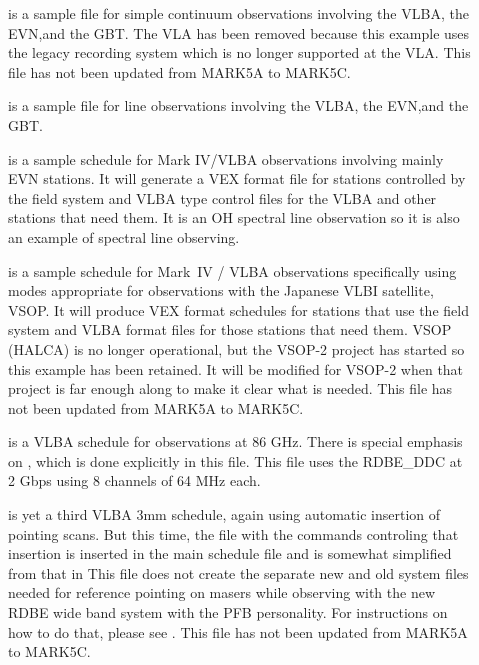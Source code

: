 \documentclass{report}
\begin{document}
\begin{description}
\item[]
is a sample file for simple continuum observations involving the VLBA,
the EVN,and the GBT.  The VLA has been removed because this example
uses the legacy recording system which is no longer supported at the
VLA. This file has not been updated from MARK5A to MARK5C.

\item[]
is a sample file for line observations involving the VLBA,
the EVN,and the GBT.

\item[] is a
sample schedule for Mark IV/VLBA observations involving mainly EVN
stations.  It will generate a VEX format file for stations controlled
by the field system and VLBA type control files for the VLBA and other
stations that need them.  It is an OH spectral line observation so it
is also an example of spectral line observing.

\item[] is a
sample schedule for Mark~IV / VLBA observations specifically using
modes appropriate for observations with the Japanese VLBI satellite,
VSOP.  It will produce VEX format schedules for stations that use the
field system and VLBA format files for those stations that need them.
VSOP (HALCA) is no longer operational, but the VSOP-2 project has started
so this example has been retained.  It will be modified for VSOP-2
when that project is far enough along to make it clear what is needed.
This file has not been updated from MARK5A to MARK5C.

\item[] is a
VLBA schedule for observations at 86 GHz.  There is special emphasis
on , which is done
explicitly in this file.   This file uses the RDBE\_DDC at 2 Gbps
using 8 channels of 64 MHz each.

\item[] is
yet a third VLBA 3mm schedule, again using automatic insertion of
pointing scans.  But this time, the file with the commands controling
that insertion is inserted in the main schedule file and is somewhat
simplified from that in 
This file does not create the separate new and old system files needed
for reference pointing on masers while observing with the new RDBE wide
band system with the PFB personality.  For instructions on how to do 
that, please see 
.
This file has not been updated from MARK5A to MARK5C.


\end{description}
\end{document}
